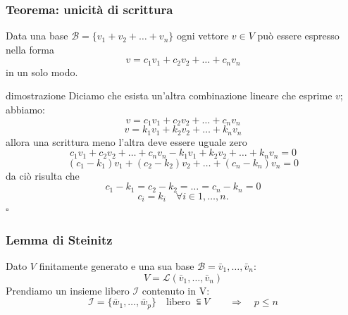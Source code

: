 \documentclass[x11names]{article}
\newcommand*{\QEDB}{\null\nobreak\hfill\ensuremath{\square}}%
\begin{document}
\begin{center}
	\colorbox{myred}{\begin{minipage}{5.75in}
			\begin{redes}{}
				\subsubsection{Teorema: unicità di scrittura}
				Data una base $\mathscr{B} = \{v_1 + v_2 + \dots + v_{n}\}$ ogni vettore $v \in V$ può essere espresso nella forma
				\[
				v = c_1v_1 + c_2v_2 + \dots + c_{n}v_{n}
				\]
				in un solo modo.
			\end{redes}
	\end{minipage}}        
\end{center}



\begin{es}{dimostrazione}
Diciamo che esista un'altra combinazione lineare che esprime $v$; abbiamo:
\[
v = c_1v_1 + c_2v_2 + \dots + c_{n}v_{n}
\]
\[
v = k_1v_1 + k_2v_2 + \dots + k_{n}v_{n}
\]
allora una scrittura meno l'altra deve essere uguale zero
\[
c_1v_1 + c_2v_2 + \dots + c_{n}v_{n} - k_1v_1 + k_2v_2 + \dots + k_{n}v_{n} = 0
\] 
\[
	\left(c_1-k_1\right)v_1 + \left(c_2-k_2\right)v_2 + \dots + \left(c_{n} - k_{n}\right)v_{n} = 0
\] 
da ciò risulta che
\[
c_1 - k_1 = c_2 - k_2 = \dots = c_{n} -k_{n} = 0
\] 
\[
c_i = k_{i} \quad \forall i \in {1,\dots,n}
.\] \QEDB
\end{es}


\subsubsection{Lemma di Steinitz}
				Dato $V$ finitamente generato e una sua base $\mathcal{B} = {\bar{v}_{1},\dots,\bar{v}_{n}}$:
				\[
				V = \mathcal{L}(\bar{v}_{1},\dots,\bar{v}_{n}) 
				\]
				Prendiamo un insieme libero $\mathcal{I}$ contenuto in V:
				\[
				\mathcal{I} = \{\bar{w}_{1},\dots,\bar{w}_{p}\} \quad \text{libero } \subseteqq V \quad  \quad \Longrightarrow \quad p \leq n
				\]
\end{document}
